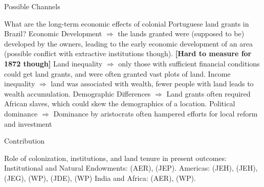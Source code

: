 \documentclass[aspectratio=1610]{beamer}
\begin{document}
\begin{frame}{Possible Channels}
    \begin{outline}
        \1 What are the long-term economic effects of colonial Portuguese land grants in Brazil?
        \vspace{2mm}
        \pause 
            \2 Economic Development $\Rightarrow$ the lands granted were (supposed to be) developed by the owners, leading to the early economic development of an area (possible conflict with extractive institutions though). \textbf{[Hard to measure for 1872 though]}
            \vspace{2mm}
            \pause 
            \2 Land inequality $\Rightarrow$ only those with sufficient financial conditions could get land grants, and were often granted vast plots of land.
            \pause 
            \vspace{2mm}
            \2 Income inequality $\Rightarrow$ land was associated with wealth, fewer people with land leads to wealth accumulation.
            \pause 
            \vspace{2mm}
            \2 Demographic Differences $\Rightarrow$ Land grants often required African slaves, which could skew the demographics of a location.
            \pause 
            \vspace{2mm}
            \2 Political dominance $\Rightarrow$ Dominance by aristocrats often hampered efforts for local reform and investment \parencites{Manchester1931-zw}[p.~40]{Bandecchi1963-uj}
    \end{outline}
\end{frame}

\begin{frame}{Contribution}
    \begin{outline}
        \1 Role of colonization, institutions, and land tenure in present outcomes:
            \vspace{2mm}
            \2 Institutional and Natural Endowments: \cite{Acemoglu2001-dz} (AER), \cite{Sokoloff2000-mb} (JEP). 
            \vspace{2mm}
            \2 Americas: \cite{Naritomi2012-or} (JEH), 
            \cite{Musacchio2014-pq} (JEH),
            \cite{Wigton-Jones2020-ex} (JEG),
            \cite{Laudares2022-vy} (WP),
            \cite{Sellars2018-yp} (JDE),
            \cite{Smith2023-ip} (WP)
            \vspace{2mm}
            \2 India and Africa: 
            \cites{Banerjee2005-ki} (AER), \cite{Lowes2020-pr} (WP).
    \end{outline}
\end{frame}
\end{document}
